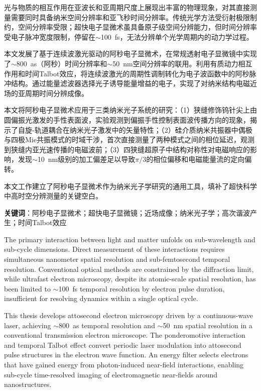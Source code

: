 \cleardoublepage
{}

光与物质的相互作用在亚波长和亚周期尺度上展现出丰富的物理现象，对其直接测量需要同时具备纳米空间分辨率和亚飞秒时间分辨率。传统光学方法受衍射极限制约，空间分辨率受限；超快电子显微术虽具备原子级空间分辨能力，但时间分辨率受电子脉冲宽度限制，停留在$\sim$\SI{100}{fs}，无法分辨单个光学周期内的动力学过程。

本文发展了基于连续波激光驱动的阿秒电子显微术，在常规透射电子显微镜中实现了$\sim$\SI{800}{as}（阿秒）时间分辨率和$\sim$\SI{50}{nm}空间分辨率的联用。利用有质动力相互作用和时间Talbot效应，将连续波激光的周期性调制转化为电子波函数中的阿秒脉冲结构。通过能量滤波器选择光子诱导能量增益的电子，实现了对纳米结构电磁近场的亚周期时间分辨成像。

本文将阿秒电子显微术应用于三类纳米光子系统的研究：（1）狭缝修饰钨针尖上由圆偏振光激发的手性表面波，实验观测到偏振手性控制表面波传播方向的现象，揭示了自旋-轨道耦合在纳米光子激发中的矢量特性；（2）硅介质纳米共振器中偶极与四极Mie共振模式的时域干涉，首次直接测量了两种模式之间的相位延迟，观测到狭缝内亚光速传播的电磁波前；（3）四狭缝超原子中结构对称性对电磁响应的影响，发现$\sim$\SI{10}{nm}级别的加工偏差足以导致$\pi/3$的相位偏移和电磁能量流的定向偏转。

本文工作建立了阿秒电子显微术作为纳米光子学研究的通用工具，填补了超快科学中高时空分辨测量的关键空白。

\bigskip
\noindent \textbf{关键词}：阿秒电子显微术；超快电子显微镜；近场成像；纳米光子学；高次谐波产生；时间Talbot效应

\cleardoublepage
{}

The primary interaction between light and matter unfolds on sub-wavelength and sub-cycle dimensions. Direct measurement of these interactions requires simultaneous nanometer spatial resolution and sub-femtosecond temporal resolution. Conventional optical methods are constrained by the diffraction limit, while ultrafast electron microscopy, despite its atomic-scale spatial resolution, has been limited to $\sim$\SI{100}{fs} temporal resolution by electron pulse duration, insufficient for resolving dynamics within a single optical cycle.

This thesis develops attosecond electron microscopy driven by a continuous-wave laser, achieving $\sim$\SI{800}{as} temporal resolution and $\sim$\SI{50}{nm} spatial resolution in a conventional transmission electron microscope. The ponderomotive interaction and temporal Talbot effect convert periodic laser modulation into attosecond pulse structures in the electron wave function. An energy filter selects electrons that have gained energy from photon-induced near-field interactions, enabling sub-cycle time-resolved imaging of electromagnetic near-fields around nanostructures.


